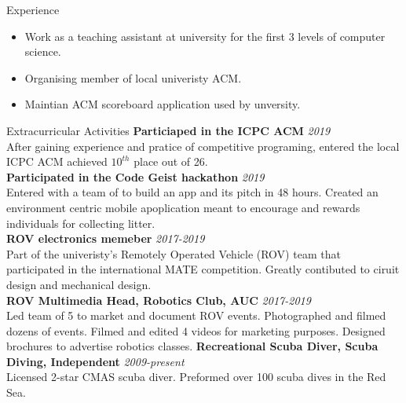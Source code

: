 \documentclass{resume}
\begin{document}
\begin{small}
	\begin{rSection}{Experience}
		\begin{itemize}
			\itemsep-0.5em
			\item Work as a teaching assistant at university for the first 3 levels of computer science.
			\item Organising member of local univeristy ACM.
			\item Maintian ACM scoreboard application used by unversity.
		\end{itemize}
	\end{rSection}
	\begin{rSection} {Extracurricular Activities}
		{\bf Particiaped in the ICPC ACM} \hfill {\em 2019} \\
		After gaining experience and pratice of competitive programing, entered the local ICPC ACM achieved $10^{th}$ place out of 26. \\
		{\bf Participated in the Code Geist hackathon } \hfill {\em 2019} \\
		Entered with a team of to build an app and its pitch in 48 hours. Created an environment centric mobile apoplication meant to encourage and rewards individuals for collecting litter.\\
		{\bf ROV electronics memeber} \hfill {\em 2017-2019} \\
		Part of the univeristy's Remotely Operated Vehicle (ROV) team that participated in the international MATE competition. Greatly contibuted to ciruit design and mechanical design. \\
		{\bf ROV Multimedia Head, Robotics Club, AUC} \hfill {\em 2017-2019} \\
		Led team of 5 to market and document ROV events. Photographed and filmed dozens of events. Filmed and edited 4 videos for marketing purposes. Designed brochures to advertise robotics classes.
		{\bf Recreational Scuba Diver, Scuba Diving, Independent} \hfill {\em 2009-present}\\
		Licensed 2-star CMAS scuba diver. Preformed over 100 scuba dives in the Red Sea.\\

\end{rSection}
\end{small}
\end{document}
